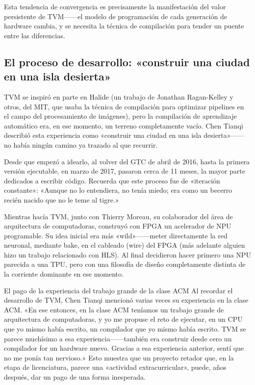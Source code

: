 \documentclass[a4paper]{article}
\begin{document}
Esta tendencia de convergencia es precisamente la manifestación del valor persistente de TVM------el modelo de programación de cada generación de hardware cambia, y se necesita la técnica de compilación para tender un puente entre las diferencias.

\subsection{El proceso de desarrollo: «construir una ciudad en una isla desierta»}

TVM se inspiró en parte en Halide (un trabajo de Jonathan Ragan-Kelley y otros, del MIT, que usaba la técnica de compilación para optimizar pipelines en el campo del procesamiento de imágenes), pero la compilación de aprendizaje automático era, en ese momento, un terreno completamente vacío. Chen Tianqi describió esta experiencia como «construir una ciudad en una isla desierta»------no había ningún camino ya trazado al que recurrir.

Desde que empezó a idearlo, al volver del GTC de abril de 2016, hasta la primera versión ejecutable, en marzo de 2017, pasaron cerca de 11 meses, la mayor parte dedicados a escribir código. Recuerda que este proceso fue de «iteración constante»: «Aunque no lo entendiera, no tenía miedo; era como un becerro recién nacido que no le teme al tigre.»

Mientras hacía TVM, junto con Thierry Moreau, su colaborador del área de arquitectura de computadoras, construyó con FPGA un acelerador de NPU programable. Su idea inicial era más «wild»------meter directamente la red neuronal, mediante bake, en el cableado (wire) del FPGA (más adelante alguien hizo un trabajo relacionado con HLS). Al final decidieron hacer primero una NPU parecida a una TPU, pero con una filosofía de diseño completamente distinta de la corriente dominante en ese momento.

\begin{warningbox}{El pago de la experiencia del trabajo grande de la clase ACM}
Al recordar el desarrollo de TVM, Chen Tianqi mencionó varias veces su experiencia en la clase ACM. «En ese entonces, en la clase ACM teníamos un trabajo grande de arquitectura de computadoras, y yo me propuse el reto de ejecutar, en un CPU que yo mismo había escrito, un compilador que yo mismo había escrito. TVM se parece muchísimo a esa experiencia------también era construir desde cero un compilador for un hardware nuevo. Gracias a esa experiencia anterior, sentí que no me ponía tan nervioso.» Esto muestra que un proyecto retador que, en la etapa de licenciatura, parece una «actividad extracurricular», puede, años después, dar un pago de una forma inesperada.
\end{warningbox}
\end{document}
